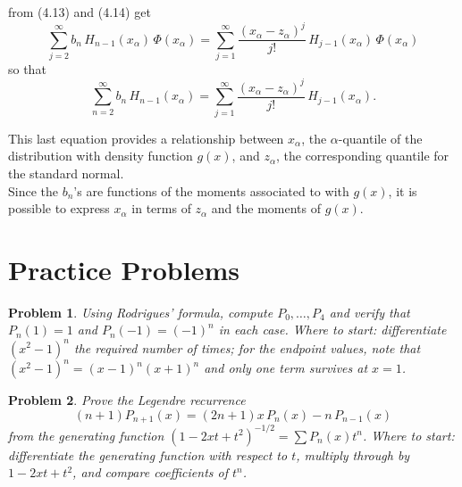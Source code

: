 \documentclass[12pt,a4paper]{report}
\theoremstyle{definition}
\theoremstyle{plain}
\newtheorem{problemx}{Problem}[section]
\newenvironment{problem}{\begin{problemx}}{\end{problemx}}
\begin{document}
from (4.13) and (4.14) get
$$\sum_{j=2}^{\infty}b_n\, H_{n-1}(x_{\alpha})\, \Phi(x_{\alpha}) = \sum_{j=1}^{\infty} \frac{(x_{\alpha} - z_{\alpha})^j}{j!}\, H_{j-1}(x_{\alpha})\, \Phi(x_{\alpha})$$
so that
$$\sum_{n=2}^{\infty}b_n \, H_{n-1}(x_{\alpha}) = \sum_{j=1}^{\infty}\frac{(x_{\alpha}-z_{\alpha})^j}{j!}\, H_{j-1}(x_{\alpha}).$$

This last equation provides a relationship between $x_{\alpha}$, the $\alpha$-quantile of the distribution with density function $g(x)$, and $z_{\alpha}$, the corresponding quantile for the standard normal.\\
Since the $b_n$'s are functions of the moments associated to with $g(x)$, it is possible to  express $x_{\alpha}$ in terms of $z_{\alpha}$ and the moments of $g(x)$.

































\section{Practice Problems}

\begin{problem}
Using Rodrigues' formula, compute $P_0,\dots,P_4$ and verify that
$P_n(1)=1$ and $P_n(-1)=(-1)^{n}$ in each case.
\emph{Where to start: differentiate $(x^{2}-1)^{n}$ the required number of
times; for the endpoint values, note that $(x^{2}-1)^{n}=(x-1)^{n}(x+1)^{n}$
and only one term survives at $x=1$.}
\end{problem}

\begin{problem}
Prove the Legendre recurrence
$$(n+1)P_{n+1}(x) = (2n+1)x\,P_n(x) - n\,P_{n-1}(x)$$
from the generating function $\left(1-2xt+t^{2}\right)^{-1/2}
= \sum P_n(x)t^{n}$.
\emph{Where to start: differentiate the generating function with respect to
$t$, multiply through by $1-2xt+t^{2}$, and compare coefficients of $t^{n}$.}
\end{problem}
\end{document}
